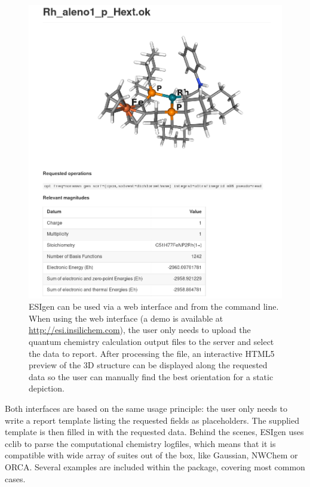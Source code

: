 \begin{figure} %
	\includegraphics[width=\textwidth]{./figures/05/esigen.png}
	\cprotect\caption[ESIgen 3D report]{ESIgen can be used via a web interface and from the command line. When using the web interface (a demo is available at \href{esi.insilichem.com}{http://esi.insilichem.com}), the user only needs to upload the quantum chemistry calculation output files to the server and select the data to report. After processing the file, an interactive HTML5 preview of the 3D structure can be displayed along the requested data so the user can manually find the best orientation for a static depiction.}
	\label{fig:esigen}
\end{figure}



Both interfaces are based on the same usage principle: the user only needs to write a report template listing the requested fields as placeholders. The supplied template is then filled in with the requested data. Behind the scenes, ESIgen uses cclib\cite{cclib} to parse the computational chemistry logfiles, which means that it is compatible with wide array of suites out of the box, like Gaussian,\cite{gaussian} NWChem\cite{nwchem} or ORCA.\cite{orca} Several examples are included within the package, covering most common cases.

